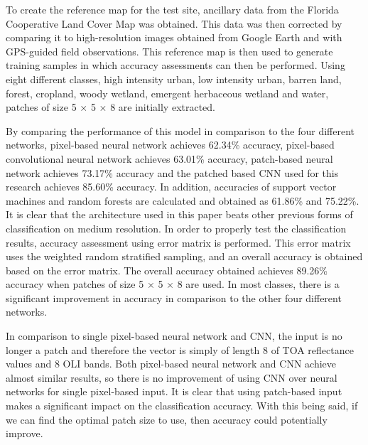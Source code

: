 \documentclass[letterpaper, 10 pt, conference]{ieeeconf}  %
\begin{document}
To create the reference map for the test site, ancillary data from the Florida Cooperative Land Cover Map was obtained. This data was then corrected by comparing it to high-resolution images obtained from Google Earth and with GPS-guided field observations. This reference map is then used to generate training samples in which accuracy assessments can then be performed. Using eight different classes, high intensity urban, low intensity urban, barren land, forest, cropland, woody wetland, emergent herbaceous wetland and water, patches of size 5 $\times$ 5 $\times$ 8 are initially extracted.

By comparing the performance of this model in comparison to the four different networks, pixel-based neural network achieves 62.34\% accuracy, pixel-based convolutional neural network achieves 63.01\% accuracy, patch-based neural network achieves 73.17\% accuracy and the patched based CNN used for this research achieves 85.60\% accuracy. In addition, accuracies of support vector machines and random forests are calculated and obtained as 61.86\% and 75.22\%. It is clear that the architecture used in this paper beats other previous forms of classification on medium resolution. In order to properly test the classification results, accuracy assessment using error matrix is performed. This error matrix uses the weighted random stratified sampling, and an overall accuracy is obtained based on the error matrix. The overall accuracy obtained achieves 89.26\% accuracy when patches of size 5 $\times$ 5 $\times$ 8 are used. In most classes, there is a significant improvement in accuracy in comparison to the other four different networks.

In comparison to single pixel-based neural network and CNN, the input is no longer a patch and therefore the vector is simply of length 8 of TOA reflectance values and 8 OLI bands. Both pixel-based neural network and CNN achieve almost similar results, so there is no improvement of using CNN over neural networks for single pixel-based input. It is clear that using patch-based input makes a significant impact on the classification accuracy. With this being said, if we can find the optimal patch size to use, then accuracy could potentially improve.
\end{document}
